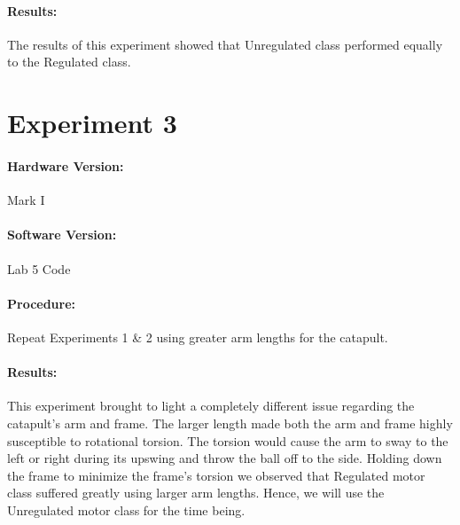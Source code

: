 \documentclass[a4]{article}
\begin{document}
\paragraph{Results:}The results of this experiment showed that Unregulated class performed equally to the Regulated class.

\section{Experiment 3}
\paragraph{Hardware Version:}Mark I
\paragraph{Software Version:}Lab 5 Code
\paragraph{Procedure:} Repeat Experiments 1 \& 2 using greater arm lengths for the catapult.
\paragraph{Results:}This experiment brought to light a completely different issue regarding the catapult's arm and frame. The larger length made both the arm and frame highly susceptible to rotational torsion. The torsion would cause the arm to sway to the left or right during its upswing and throw the ball off to the side. Holding down the frame to minimize the frame's torsion we observed that Regulated motor class suffered greatly using larger arm lengths. Hence, we will use the Unregulated motor class for the time being.
\end{document}
